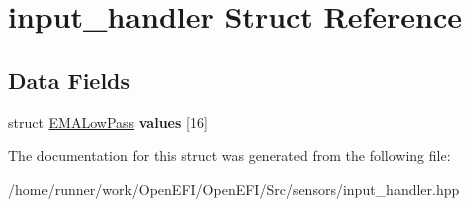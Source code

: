 \hypertarget{structinput__handler}{}\section{input\+\_\+handler Struct Reference}
\label{structinput__handler}
\subsection*{Data Fields}
\begin{DoxyCompactItemize}
\item 
\mbox{\label{structinput__handler_a76a0e5349d8566a86ac7efa33c36c076}} 
struct \hyperlink{structEMALowPass}{E\+M\+A\+Low\+Pass} {\bfseries values} \mbox{[}16\mbox{]}
\end{DoxyCompactItemize}


The documentation for this struct was generated from the following file\+:\begin{DoxyCompactItemize}
\item 
/home/runner/work/\+Open\+E\+F\+I/\+Open\+E\+F\+I/\+Src/sensors/input\+\_\+handler.\+hpp\end{DoxyCompactItemize}
